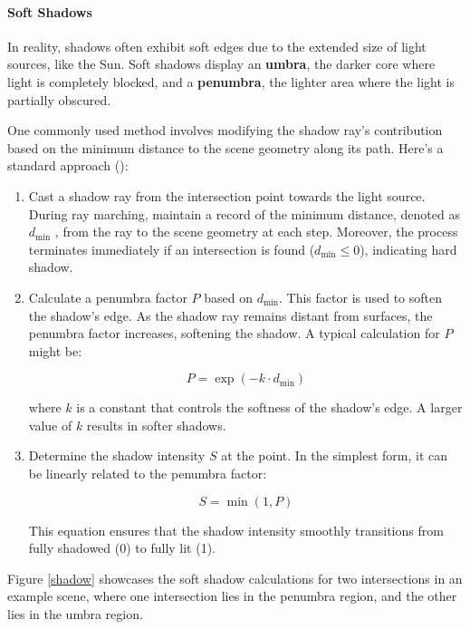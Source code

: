 \paragraph{Soft Shadows}
In reality, shadows often exhibit soft edges due to the extended size of light sources, like the Sun. Soft shadows display an \textbf{umbra}, the darker core where light is completely blocked, and a \textbf{penumbra}, the lighter area where the light is partially obscured.

One commonly used method involves modifying the shadow ray's contribution based on the minimum distance to the scene geometry along its path. Here's a standard approach ():

\begin{enumerate}
    \item Cast a shadow ray from the intersection point towards the light source. During ray marching, maintain a record of the minimum distance, denoted as $d_{\text{min}}$ , from the ray to the scene geometry at each step. Moreover, the process terminates immediately if an intersection is found ($d_{\text{min}}\le 0$), indicating hard shadow.

    \item Calculate a penumbra factor $P$ based on $d_{\text{min}}$. This factor is used to soften the shadow's edge. As the shadow ray remains distant from surfaces, the penumbra factor increases, softening the shadow. A typical calculation for $P$ might be:

    \begin{equation}
       P = \exp(-k \cdot d_{\text{min}})
    \end{equation}

    where $k$ is a constant that controls the softness of the shadow's edge. A larger value of $k$ results in softer shadows.

    \item Determine the shadow intensity $S$ at the point. In the simplest form, it can be linearly related to the penumbra factor:

    \begin{equation}
    S = \min(1, P)
    \end{equation}

    This equation ensures that the shadow intensity smoothly transitions from fully shadowed (0) to fully lit (1).
\end{enumerate}

Figure \ref{shadow} showcases the soft shadow calculations for two intersections in an example scene, where one intersection lies in the penumbra region, and the other lies in the umbra region.

